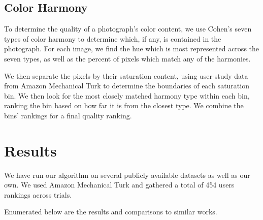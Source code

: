 \documentclass{article}
\begin{document}
\subsection{Color Harmony}   

To determine the quality of a photograph's color content, we use Cohen's seven types of color harmony\cite{Cohen-Or:2006:CH:1179352.1141933} to determine which, if any, is contained in the photograph. For each image, we find the hue which is most represented across the seven types, as well as the percent of pixels which match any of the harmonies.

We then separate the pixels by their saturation content, using user-study data from Amazon Mechanical Turk to determine the boundaries of each saturation bin. We then look for the most closely matched harmony type within each bin, ranking the bin based on how far it is from the closest type. We combine the bins' rankings for a final quality ranking.



\section{Results}
We have run our algorithm on several publicly available datasets as well as our own. We used Amazon Mechanical Turk and gathered a total of 454 users rankings across trials.

Enumerated below are the results and comparisons to similar works.
\end{document}
